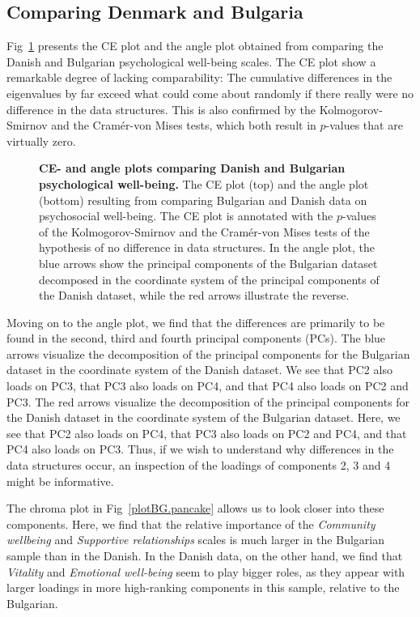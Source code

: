 \documentclass[a4paper,14pt]{article}
\begin{document}
\subsection*{Comparing Denmark and Bulgaria}
Fig~\ref{plotBG.cehair} presents the CE plot and the angle plot obtained from comparing the Danish and Bulgarian psychological well-being scales. The CE plot show a remarkable degree of lacking comparability: The cumulative differences in the eigenvalues by far exceed what could come about randomly if there really were no difference in the data structures. This is also confirmed by the Kolmogorov-Smirnov and the Cram\'er-von Mises tests, which both result in $p$-values that are virtually zero.

\begin{figure}[!h]
\caption{{\bf CE- and angle plots comparing Danish and Bulgarian psychological well-being.} The CE plot (top) and the angle plot (bottom) resulting from comparing Bulgarian and Danish data on psychosocial well-being. The CE plot is annotated with the $p$-values of the Kolmogorov-Smirnov and the Cram\'er-von Mises tests of the hypothesis of no difference in data structures. In the angle plot, the blue arrows show the principal components of the Bulgarian dataset decomposed in the coordinate system of the principal components of the Danish dataset, while the red arrows illustrate the reverse.}
\label{plotBG.cehair}
\end{figure}

Moving on to the angle plot, we find that the differences are primarily to be found in the second, third and fourth principal components (PCs). The blue arrows visualize the decomposition of the principal components for the Bulgarian dataset in the coordinate system of the Danish dataset. We see that PC2 also loads on PC3, that PC3 also loads on PC4, and that PC4 also loads on PC2 and PC3. The red arrows visualize the decomposition of the principal components for the Danish dataset in the coordinate system of the Bulgarian dataset. Here, we see that PC2 also loads on PC4, that PC3 also loads on PC2 and PC4, and that PC4 also loads on PC3. Thus, if we wish to understand why differences in the data structures occur, an inspection of the loadings of components 2, 3 and 4 might be informative.

The chroma plot in Fig~\ref{plotBG.pancake} allows us to look closer into these components. Here, we find that the relative importance of the \textit{Community wellbeing} and \textit{Supportive relationships} scales is much larger in the Bulgarian sample than in the Danish. In the Danish data, on the other hand, we find that \textit{Vitality} and \textit{Emotional well-being} seem to play bigger roles, as they appear with larger loadings in more high-ranking components in this sample, relative to the Bulgarian.
\end{document}
